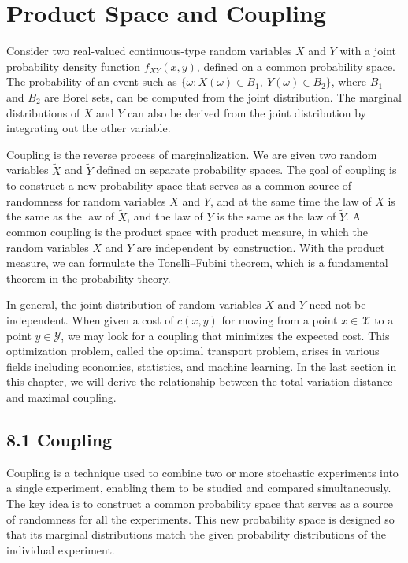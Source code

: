 \section*{Product Space and Coupling}

Consider two real-valued continuous-type random variables $X$ and $Y$ with a joint probability density function $f_{XY}(x,y)$, defined on a common probability space. The probability of an event such as $\{\omega : X(\omega)\in B_1,\ Y(\omega)\in B_2\}$, where $B_1$ and $B_2$ are Borel sets, can be computed from the joint distribution. The marginal distributions of $X$ and $Y$ can also be derived from the joint distribution by integrating out the other variable.

Coupling is the reverse process of marginalization. We are given two random variables $\tilde{X}$ and $\tilde{Y}$ defined on separate probability spaces. The goal of coupling is to construct a new probability space that serves as a common source of randomness for random variables $X$ and $Y$, and at the same time the law of $X$ is the same as the law of $\tilde{X}$, and the law of $Y$ is the same as the law of $\tilde{Y}$. A common coupling is the product space with product measure, in which the random variables $X$ and $Y$ are independent by construction. With the product measure, we can formulate the Tonelli--Fubini theorem, which is a fundamental theorem in the probability theory.

In general, the joint distribution of random variables $X$ and $Y$ need not be independent. When given a cost of $c(x,y)$ for moving from a point $x\in \mathcal{X}$ to a point $y\in \mathcal{Y}$, we may look for a coupling that minimizes the expected cost. This optimization problem, called the optimal transport problem, arises in various fields including economics, statistics, and machine learning. In the last section in this chapter, we will derive the relationship between the total variation distance and maximal coupling.

\subsection*{8.1 Coupling}

Coupling is a technique used to combine two or more stochastic experiments into a single experiment, enabling them to be studied and compared simultaneously. The key idea is to construct a common probability space that serves as a source of randomness for all the experiments. This new probability space is designed so that its marginal distributions match the given probability distributions of the individual experiment.

